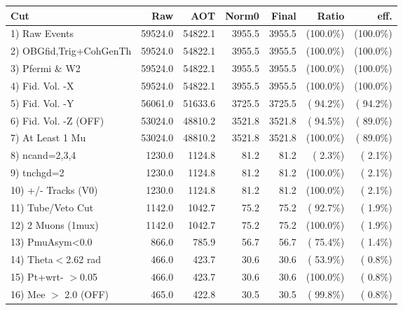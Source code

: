  \begin{table}[h!]\centering
 \begin{tabular}{||l||r|r|r|r|r|r||}
 \hline
 \hline
 Cut & Raw & AOT & Norm0 & Final & Ratio & eff.       \\
 \hline
  1) Raw Events           &      59524.0 &      54822.1 &       3955.5 &       3955.5 & (100.0\%) & (100.0\%) \\
  2) OBGfid,Trig+CohGenTh &      59524.0 &      54822.1 &       3955.5 &       3955.5 & (100.0\%) & (100.0\%) \\
  3) Pfermi \& W2         &      59524.0 &      54822.1 &       3955.5 &       3955.5 & (100.0\%) & (100.0\%) \\
  4) Fid. Vol. -X         &      59524.0 &      54822.1 &       3955.5 &       3955.5 & (100.0\%) & (100.0\%) \\
  5) Fid. Vol. -Y         &      56061.0 &      51633.6 &       3725.5 &       3725.5 & ( 94.2\%) & ( 94.2\%) \\
  6) Fid. Vol. -Z (OFF)   &      53024.0 &      48810.2 &       3521.8 &       3521.8 & ( 94.5\%) & ( 89.0\%) \\
  7) At Least 1 Mu        &      53024.0 &      48810.2 &       3521.8 &       3521.8 & (100.0\%) & ( 89.0\%) \\
  8) ncand=2,3,4          &       1230.0 &       1124.8 &         81.2 &         81.2 & (  2.3\%) & (  2.1\%) \\
  9) tnchgd=2             &       1230.0 &       1124.8 &         81.2 &         81.2 & (100.0\%) & (  2.1\%) \\
 10) +/- Tracks (V0)      &       1230.0 &       1124.8 &         81.2 &         81.2 & (100.0\%) & (  2.1\%) \\
 11) Tube/Veto Cut        &       1142.0 &       1042.7 &         75.2 &         75.2 & ( 92.7\%) & (  1.9\%) \\
 12) 2 Muons (1mux)       &       1142.0 &       1042.7 &         75.2 &         75.2 & (100.0\%) & (  1.9\%) \\
 13) PmuAsym<0.0          &        866.0 &        785.9 &         56.7 &         56.7 & ( 75.4\%) & (  1.4\%) \\
 14) Theta$<$2.62 rad     &        466.0 &        423.7 &         30.6 &         30.6 & ( 53.9\%) & (  0.8\%) \\
 15) Pt+wrt- $>$0.05      &        466.0 &        423.7 &         30.6 &         30.6 & (100.0\%) & (  0.8\%) \\
 16) Mee $>$ 2.0  (OFF)   &        465.0 &        422.8 &         30.5 &         30.5 & ( 99.8\%) & (  0.8\%) \\

\end{tabular}
\end{table}
